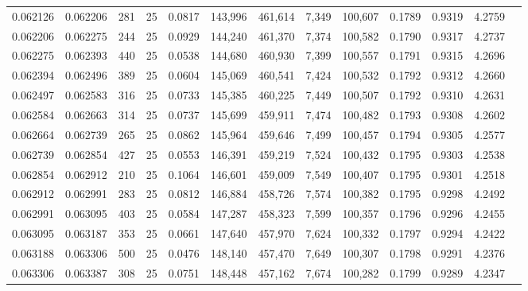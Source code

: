 \begin{tabular}{rrrrrrrrrrrrr}
0.062126 & 0.062206 &   281 &  25 &                                     0.0817 & 143,996 & 461,614 &   7,349 & 100,607 & 0.1789 & 0.9319 & 4.2759 \\
0.062206 & 0.062275 &   244 &  25 &                                     0.0929 & 144,240 & 461,370 &   7,374 & 100,582 & 0.1790 & 0.9317 & 4.2737 \\
0.062275 & 0.062393 &   440 &  25 &                                     0.0538 & 144,680 & 460,930 &   7,399 & 100,557 & 0.1791 & 0.9315 & 4.2696 \\
0.062394 & 0.062496 &   389 &  25 &                                     0.0604 & 145,069 & 460,541 &   7,424 & 100,532 & 0.1792 & 0.9312 & 4.2660 \\
0.062497 & 0.062583 &   316 &  25 &                                     0.0733 & 145,385 & 460,225 &   7,449 & 100,507 & 0.1792 & 0.9310 & 4.2631 \\
0.062584 & 0.062663 &   314 &  25 &                                     0.0737 & 145,699 & 459,911 &   7,474 & 100,482 & 0.1793 & 0.9308 & 4.2602 \\
0.062664 & 0.062739 &   265 &  25 &                                     0.0862 & 145,964 & 459,646 &   7,499 & 100,457 & 0.1794 & 0.9305 & 4.2577 \\
0.062739 & 0.062854 &   427 &  25 &                                     0.0553 & 146,391 & 459,219 &   7,524 & 100,432 & 0.1795 & 0.9303 & 4.2538 \\
0.062854 & 0.062912 &   210 &  25 &                                     0.1064 & 146,601 & 459,009 &   7,549 & 100,407 & 0.1795 & 0.9301 & 4.2518 \\
0.062912 & 0.062991 &   283 &  25 &                                     0.0812 & 146,884 & 458,726 &   7,574 & 100,382 & 0.1795 & 0.9298 & 4.2492 \\
0.062991 & 0.063095 &   403 &  25 &                                     0.0584 & 147,287 & 458,323 &   7,599 & 100,357 & 0.1796 & 0.9296 & 4.2455 \\
0.063095 & 0.063187 &   353 &  25 &                                     0.0661 & 147,640 & 457,970 &   7,624 & 100,332 & 0.1797 & 0.9294 & 4.2422 \\
0.063188 & 0.063306 &   500 &  25 &                                     0.0476 & 148,140 & 457,470 &   7,649 & 100,307 & 0.1798 & 0.9291 & 4.2376 \\
0.063306 & 0.063387 &   308 &  25 &                                     0.0751 & 148,448 & 457,162 &   7,674 & 100,282 & 0.1799 & 0.9289 & 4.2347 \\

\end{tabular}

